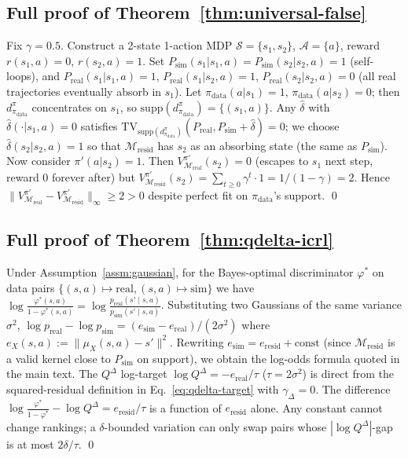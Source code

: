 \documentclass{article}
\theoremstyle{definition}
\newcommand{\Mreal}{\mathcal{M}_{\mathrm{real}}}
\newcommand{\Mresid}{\mathcal{M}_{\mathrm{resid}}}
\newcommand{\Psim}{P_{\mathrm{sim}}}
\newcommand{\Preal}{P_{\mathrm{real}}}
\newcommand{\supp}{\mathrm{supp}}
\newcommand{\dpi}{d^{\pi}}
\newcommand{\pidata}{\pi_{\mathrm{data}}}
\newcommand{\QD}{Q^{\Delta}}
\begin{document}
\subsection{Full proof of Theorem~\ref{thm:universal-false}}

Fix $\gamma=0.5$.  Construct a 2-state 1-action MDP
$\mathcal S=\{s_1,s_2\}$, $\mathcal A=\{a\}$, reward
$r(s_1,a)=0$, $r(s_2,a)=1$.  Set
$\Psim(s_1|s_1,a)=\Psim(s_2|s_2,a)=1$ (self-loops), and
$\Preal(s_1|s_1,a)=1$, $\Preal(s_1|s_2,a)=1$, $\Preal(s_2|s_2,a)=0$
(all real trajectories eventually absorb in $s_1$).
Let $\pidata(a|s_1)=1$, $\pidata(a|s_2)=0$; then $\dpi_{\pidata}$
concentrates on $s_1$, so
$\supp(\dpi_{\pidata})=\{(s_1,a)\}$.
Any $\hat\delta$ with $\hat\delta(\cdot|s_1,a)=0$ satisfies
$\mathrm{TV}_{\supp(\dpi_{\pidata})}(\Preal,\Psim+\hat\delta)=0$; we
choose $\hat\delta(s_2|s_2,a)=1$ so that
$\Mresid$ has $s_2$ as an absorbing state (the same as $\Psim$).
Now consider $\pi'(a|s_2)=1$.  Then $V^{\pi'}_{\Mreal}(s_2) = 0$
(escapes to $s_1$ next step, reward 0 forever after) but
$V^{\pi'}_{\Mresid}(s_2) = \sum_{t\ge 0}\gamma^t\cdot 1 = 1/(1-\gamma)=2$.
Hence $\|V^{\pi'}_{\Mreal}-V^{\pi'}_{\Mresid}\|_\infty\ge 2>0$
despite perfect fit on $\pidata$'s support.
\qed

\subsection{Full proof of Theorem~\ref{thm:qdelta-icrl}}

Under Assumption~\ref{assm:gaussian}, for the Bayes-optimal
discriminator $\varphi^*$ on data pairs
$\{(s,a)\mapsto\text{real}, (s,a)\mapsto\text{sim}\}$ we have
$\log\tfrac{\varphi^*(s,a)}{1-\varphi^*(s,a)} = \log\tfrac{p_\mathrm{real}(s'\mid s,a)}{p_\mathrm{sim}(s'\mid s,a)}$.
Substituting two Gaussians of the same variance $\sigma^2$,
$\log p_\mathrm{real} - \log p_\mathrm{sim} = (e_\mathrm{sim}-e_\mathrm{real})/(2\sigma^2)$
where $e_X(s,a):=\|\mu_X(s,a)-s'\|^2$.
Rewriting $e_\mathrm{sim} = e_\mathrm{resid}+\mathrm{const}$ (since
$\Mresid$ is a valid kernel close to $\Psim$ on support), we obtain the
log-odds formula quoted in the main text.  The $\QD$ log-target
$\log\QD = -e_\mathrm{real}/\tau$ ($\tau=2\sigma^2$) is direct from the
squared-residual definition in Eq.~\eqref{eq:qdelta-target} with
$\gamma_\Delta=0$.  The difference
$\log\tfrac{\varphi^*}{1-\varphi^*}-\log\QD = e_\mathrm{resid}/\tau$
is a function of $e_\mathrm{resid}$ alone.  Any constant cannot change
rankings; a $\delta$-bounded variation can only swap pairs whose
$|\log\QD|$-gap is at most $2\delta/\tau$.
\qed
\end{document}
